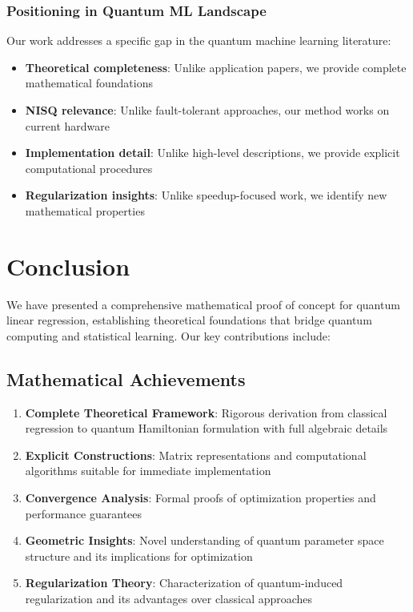 \documentclass[11pt]{article}
\begin{document}
\subsubsection{Positioning in Quantum ML Landscape}

Our work addresses a specific gap in the quantum machine learning literature:

\begin{itemize}
\item \textbf{Theoretical completeness}: Unlike application papers, we provide complete mathematical foundations
\item \textbf{NISQ relevance}: Unlike fault-tolerant approaches, our method works on current hardware
\item \textbf{Implementation detail}: Unlike high-level descriptions, we provide explicit computational procedures
\item \textbf{Regularization insights}: Unlike speedup-focused work, we identify new mathematical properties
\end{itemize}

\section{Conclusion}

We have presented a comprehensive mathematical proof of concept for quantum linear regression, establishing theoretical foundations that bridge quantum computing and statistical learning. Our key contributions include:

\subsection{Mathematical Achievements}

\begin{enumerate}
\item \textbf{Complete Theoretical Framework}: Rigorous derivation from classical regression to quantum Hamiltonian formulation with full algebraic details
\item \textbf{Explicit Constructions}: Matrix representations and computational algorithms suitable for immediate implementation
\item \textbf{Convergence Analysis}: Formal proofs of optimization properties and performance guarantees
\item \textbf{Geometric Insights}: Novel understanding of quantum parameter space structure and its implications for optimization
\item \textbf{Regularization Theory}: Characterization of quantum-induced regularization and its advantages over classical approaches
\end{enumerate}
\end{document}
